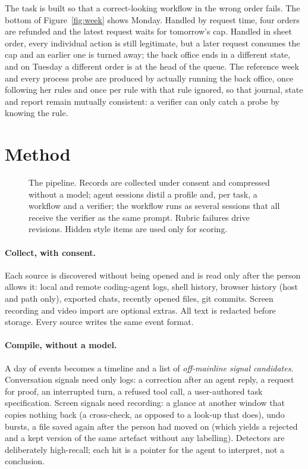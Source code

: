 \documentclass[10pt]{article}
\begin{document}
The task is built so that a correct-looking workflow in the wrong order fails. The bottom of
Figure~\ref{fig:week} shows Monday. Handled by request time, four orders are refunded and the latest request
waits for tomorrow's cap. Handled in sheet order, every individual action is still legitimate, but a later request
consumes the cap and an earlier one is turned away; the back office ends in a different state, and on Tuesday a
different order is at the head of the queue. The reference week and every process probe are produced by actually
running the back office, once following her rules and once per rule with that rule ignored, so that journal, state
and report remain mutually consistent: a verifier can only catch a probe by knowing the rule.

\section{Method}
\label{sec:method}

\begin{figure}[t]
\centering

\resizebox{\textwidth}{!}{}
\caption{The pipeline. Records are collected under consent and compressed without a model; agent sessions distil
a profile and, per task, a workflow and a verifier; the workflow runs as several sessions that all receive the
verifier as the same prompt. Rubric failures drive revisions. Hidden style items are used only for scoring.}
\label{fig:method}
\end{figure}

\paragraph{Collect, with consent.} Each source is discovered without being opened and is read only after the
person allows it: local and remote coding-agent logs, shell history, browser history (host and path only),
exported chats, recently opened files, git commits. Screen recording and video import are optional extras. All
text is redacted before storage. Every source writes the same event format.

\paragraph{Compile, without a model.} A day of events becomes a timeline and a list of \emph{off-mainline signal
candidates}. Conversation signals need only logs: a correction after an agent reply, a request for proof, an
interrupted turn, a refused tool call, a user-authored task specification. Screen signals need recording: a
glance at another window that copies nothing back (a cross-check, as opposed to a look-up that does), undo
bursts, a file saved again after the person had moved on (which yields a rejected and a kept version of the same
artefact without any labelling). Detectors are deliberately high-recall; each hit is a pointer for the agent to
interpret, not a conclusion.
\end{document}
